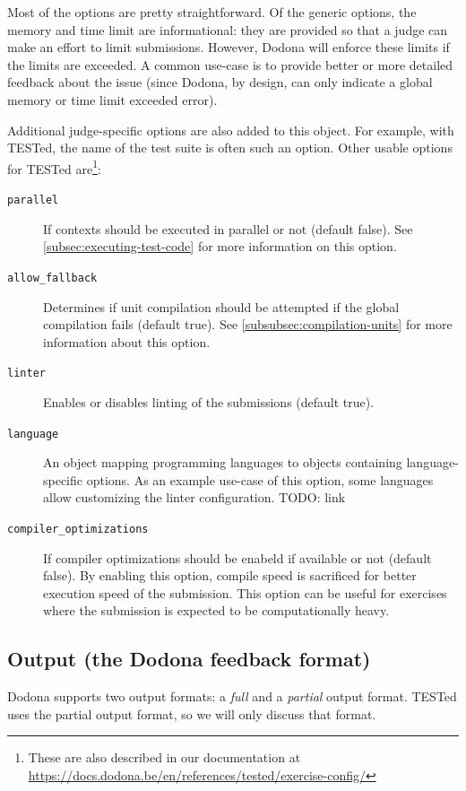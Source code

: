 \documentclass[../main]{subfiles}
\begin{document}
Most of the options are pretty straightforward.
Of the generic options, the memory and time limit are informational: they are provided so that a judge can make an effort to limit submissions.
However, Dodona will enforce these limits if the limits are exceeded.
A common use-case is to provide better or more detailed feedback about the issue (since Dodona, by design, can only indicate a global memory or time limit exceeded error).

Additional judge-specific options are also added to this object.
For example, with TESTed, the name of the test suite is often such an option.
Other usable options for TESTed are\footnote{These are also described in our documentation at \url{https://docs.dodona.be/en/references/tested/exercise-config/}}:

\begin{description}
    \item[\texttt{parallel}] If contexts should be executed in parallel or not (default false). See \cref{subsec:executing-test-code} for more information on this option.
    \item[\texttt{allow\_fallback}] Determines if unit compilation should be attempted if the global compilation fails (default true). See \cref{subsubsec:compilation-units} for more information about this option.
    \item[\texttt{linter}] Enables or disables linting of the submissions (default true).
    \item[\texttt{language}] An object mapping programming languages to objects containing language-specific options. As an example use-case of this option, some languages allow customizing the linter configuration. TODO: link
    \item[\texttt{compiler\_optimizations}] If compiler optimizations should be enabeld if available or not (default false). By enabling this option, compile speed is sacrificed for better execution speed of the submission. This option can be useful for exercises where the submission is expected to be computationally heavy.
\end{description}

\subsection{Output (the Dodona feedback format)}\label{subsec:dodona-output}

Dodona supports two output formats: a \emph{full} and a \emph{partial} output format.
TESTed uses the partial output format, so we will only discuss that format.
\end{document}
